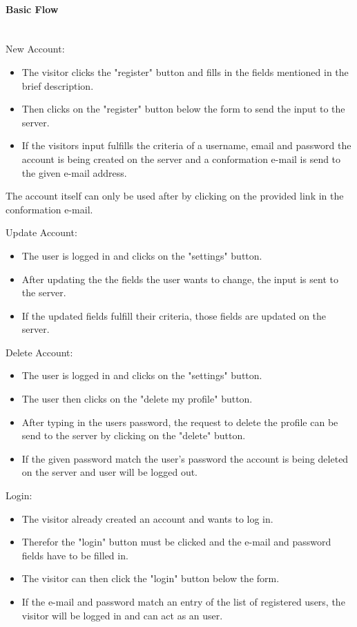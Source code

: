\paragraph*{Basic Flow} \mbox{}\\
\noindent
New Account:
\begin{itemize}
	\vspace{-3mm}
	\setlength\itemsep{-1em}
	
	\item The visitor clicks the "register" button and fills in the fields mentioned in the brief description.
	\item Then clicks on the "register" button below the form to send the input to the server.
	\item If the visitors input fulfills the criteria of a username, email and password the account is being created on the server and a conformation e-mail is send to the given e-mail address.
\end{itemize}
The account itself can only be used after by clicking on the provided link in the conformation e-mail.

\noindent
Update Account: 
\begin{itemize}
	\vspace{-3mm}
	\setlength\itemsep{-1em}
	\item The user is logged in and clicks on the "settings" button.
	\item After updating the the fields the user wants to change, the input is sent to the server.
	\item If the updated fields fulfill their criteria, those fields are updated on the server.
\end{itemize} 

\noindent
Delete Account:
\begin{itemize}
	\vspace{-3mm}
	\setlength\itemsep{-1em}
	\item The user is logged in and clicks on the "settings" button.
	\item The user then clicks on the "delete my profile" button. 
	\item After typing in the users password, the request to delete the profile can be send to the server by clicking on the "delete" button.
	\item If the given password match the user's password the account is being deleted on the server and user will be logged out.
\end{itemize}

\noindent
Login:
\begin{itemize}
	\vspace{-3mm}
	\setlength\itemsep{-1em}
	\item The visitor already created an account and wants to log in.
	\item Therefor the "login" button must be clicked and the e-mail and password fields have to be filled in.
	\item The visitor can then click the "login" button below the form.
	\item If the e-mail and password match an entry of the list of registered users, the visitor will be logged in and can act as an user.
\end{itemize}


